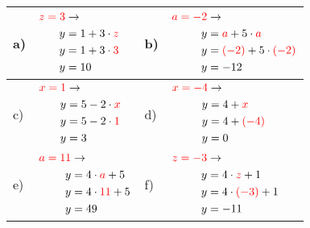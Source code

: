 \documentclass[12pt]{article}
\begin{document}
\begin{xltabular}{\textwidth}{|C{0.75cm}|X|C{0.75cm}|X|}
\hline
a)&$\begin{aligned}
\textcolor{red}{z=3} & \rightarrow\\
y&=1 + 3 \cdot \textcolor{red}{z}\\
y&=1 + 3 \cdot \textcolor{red}{3}\\
y&=10\\
\end{aligned}$
&
b)&$\begin{aligned}
\textcolor{red}{a=-2} & \rightarrow\\
y&=\textcolor{red}{a} + 5 \cdot \textcolor{red}{a}\\
y&=\textcolor{red}{(-2)} + 5 \cdot \textcolor{red}{(-2)}\\
y&=-12\\
\end{aligned}$
\\\hline
c)&$\begin{aligned}
\textcolor{red}{x=1} & \rightarrow\\
y&=5 - 2 \cdot \textcolor{red}{x}\\
y&=5 - 2 \cdot \textcolor{red}{1}\\
y&=3\\
\end{aligned}$
&
d)&$\begin{aligned}
\textcolor{red}{x=-4} & \rightarrow\\
y&=4 + \textcolor{red}{x}\\
y&=4 + \textcolor{red}{(-4)}\\
y&=0\\
\end{aligned}$
\\\hline
e)&$\begin{aligned}
\textcolor{red}{a=11} & \rightarrow\\
y&=4 \cdot \textcolor{red}{a} + 5\\
y&=4 \cdot \textcolor{red}{11} + 5\\
y&=49\\
\end{aligned}$
&
f)&$\begin{aligned}
\textcolor{red}{z=-3} & \rightarrow\\
y&=4 \cdot \textcolor{red}{z} + 1\\
y&=4 \cdot \textcolor{red}{(-3)} + 1\\
y&=-11\\
\end{aligned}$

\end{xltabular}
\end{document}
